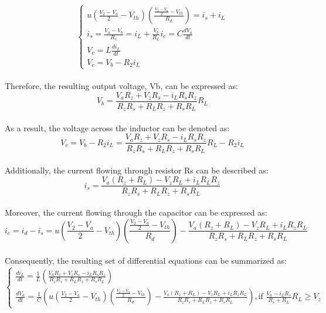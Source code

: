 \begin{equation}
    \begin{cases}
        u(\frac{V_2-V_a}{2}-V_{th})(\frac{\frac{V_2-V_a}{2}-V_{th}}{R_d})=i_s+i_L\\
        i_s=\frac{V_a-V_b}{R_s}=i_L+\frac{V_b}{R_L}
        i_c=C\frac{dV_a}{dt}\\
        V_c=L\frac{di_L}{dt}\\
        V_c=V_b-R_2i_L
    \end{cases}
\end{equation}\\

Therefore, the resulting output voltage, Vb, can be expressed as:\\

\begin{equation}
    V_b=\frac{V_aR_z+V_zR_s-i_LR_sR_z}{R_zR_s+R_LR_z+R_sR_L}R_L
\end{equation}\\

As a result, the voltage across the inductor can be denoted as:\\

\begin{equation}
    V_c=V_b-R_2i_L=\frac{V_aR_z+V_zR_s-i_LR_sR_z}{R_zR_s+R_LR_z+R_sR_L}R_L-R_2i_L
\end{equation}\\

Additionally, the current flowing through resistor Rs can be described as:\\

\begin{equation}
    i_s=\frac{V_a(R_z+R_L)-V_zR_L+i_LR_LR_z}{R_zR_s+R_LR_z+R_sR_L}
\end{equation}\\

Moreover, the current flowing through the capacitor can be expressed as:\\

\begin{equation}
    i_c=i_d-i_s=u(\frac{V_2-V_a}{2}-V_{th})(\frac{\frac{V_2-V_a}{2}-V_{th}}{R_d})-\frac{V_a(R_z+R_L)-V_zR_L+i_LR_zR_L}{R_zR_s+R_LR_z+R_sR_L}
\end{equation}\\

Consequently, the resulting set of differential equations can be summarized as:\\

\begin{equation}
    \begin{cases}
        \frac{di_L}{dt}=\frac{1}{L}(\frac{V_aR_z+V_zR_s-i_LR_sR_z}{R_zR_s+R_LR_z+R_sR_L})\\
        \frac{dV_a}{dt}=\frac{1}{C}(u(\frac{V_2-V_a}{2}-V_{th})(\frac{\frac{V_2-V_a}{2}-V_{th}}{R_d})-\frac{V_a(R_z+R_L)-V_zR_L+i_LR_zR_L}{R_zR_s+R_LR_z+R_sR_L}),  \text{if } \frac{V_a-i_LR_s}{R_s+R_L}R_L \geq V_z
    \end{cases}
\end{equation}\\



